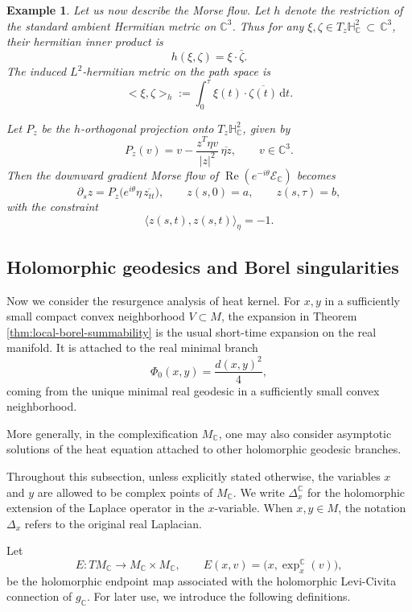 \documentclass[11pt]{amsart}
\theoremstyle{plain}
\newtheorem{eg}[thm]{Example}
\theoremstyle{definition}
\newcommand{\C}{\mathbb{C}}
\newcommand{\dd}{\mathrm d}
\newcommand{\HH}{\mathbb{H}}
\DeclareMathOperator{\re}{Re}
\begin{document}
\begin{eg}
Let us now describe the Morse flow. Let $h$ denote the restriction of the standard ambient Hermitian metric on $\C^3$. Thus for any $\xi,\zeta\in T_{z}\HH_{\C}^2\,\subset\,\C^3$, their hermitian inner product is
\[
h(\xi,\zeta)=\xi\cdot \overline{\zeta}.
\]
The induced $L^2$-hermitian metric on the path space is
\[<\xi,\zeta>_h:=\int_0^{\tau} \xi(t)\cdot \overline{\zeta(t)}\,\dd t.
\]

Let $P_z$ be the $h$-orthogonal projection onto $T_z\HH_{\C}^2$, given by
\begin{equation*}\label{eq:projection}
P_z(v)=v-\frac{z^T\eta v}{|z|^2}\,\overline{\eta z},\qquad v\in\C^3.
\end{equation*}
Then the downward gradient Morse flow of $ \re(e^{-i\theta}\mathcal E_\C)$ becomes 
\[
\partial_s z=P_z\bigl(e^{i\theta}\eta\,\overline{z_{tt}}\bigr),
\qquad
z(s,0)=a,
\qquad
z(s,\tau)=b,
\]
with the constraint
\[\langle z(s,t), z(s,t)\rangle_{\eta}=-1.\]
\end{eg}


\subsection{Holomorphic geodesics and Borel singularities}
Now we consider the resurgence analysis of heat kernel. For $x,y$ in a sufficiently small compact convex neighborhood $V\subset M$, the expansion in Theorem \ref{thm:local-borel-summability} is the usual short-time expansion on the real
manifold. It is attached to the real minimal branch
\[
\Phi_0(x,y)=\frac{d(x,y)^2}{4},
\]
coming from the unique minimal real geodesic in a sufficiently small convex
neighborhood.



More generally, in the complexification $M_{\mathbb C}$, one may also consider asymptotic solutions of the heat equation attached to other holomorphic geodesic branches.

Throughout this subsection, unless explicitly stated otherwise, the variables $x$ and $y$ are allowed to be complex points of
$M_{\mathbb C}$. We write $\Delta_x^{\mathbb C}$ for the holomorphic extension of the Laplace operator in the $x$-variable. When $x,y\in M$, the notation $\Delta_x$ refers to the original real Laplacian.

Let
\[
E:TM_{\mathbb C}\longrightarrow M_{\mathbb C}\times M_{\mathbb C},
\qquad E(x,v)=\bigl(x,\exp_x^{\mathbb C}(v)\bigr),
\]
be the holomorphic endpoint map associated with the holomorphic
Levi-Civita connection of $g_{\mathbb C}$. For later use, we introduce the following definitions.
\end{document}
